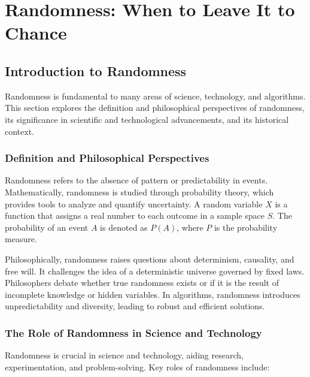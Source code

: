 \documentclass[12pt]{book} %
\begin{document}
\chapter{Randomness: When to Leave It to Chance}

\section{Introduction to Randomness}

Randomness is fundamental to many areas of science, technology, and algorithms. This section explores the definition and philosophical perspectives of randomness, its significance in scientific and technological advancements, and its historical context.

\subsection{Definition and Philosophical Perspectives}

Randomness refers to the absence of pattern or predictability in events. Mathematically, randomness is studied through probability theory, which provides tools to analyze and quantify uncertainty. A random variable \(X\) is a function that assigns a real number to each outcome in a sample space \(S\). The probability of an event \(A\) is denoted as \(P(A)\), where \(P\) is the probability measure.

Philosophically, randomness raises questions about determinism, causality, and free will. It challenges the idea of a deterministic universe governed by fixed laws. Philosophers debate whether true randomness exists or if it is the result of incomplete knowledge or hidden variables. In algorithms, randomness introduces unpredictability and diversity, leading to robust and efficient solutions.

\subsection{The Role of Randomness in Science and Technology}

Randomness is crucial in science and technology, aiding research, experimentation, and problem-solving. Key roles of randomness include:
\end{document}
